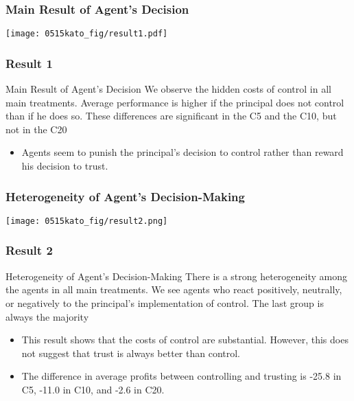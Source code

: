 \documentclass[unicode,12pt]{beamer}
\begin{document}
    \begin{frame}
        \frametitle{Main Result of Agent's Decision}
    
        \centerline{\texttt{[image: 0515kato\_fig/result1.pdf]}}
    
    \end{frame}

    \begin{frame}
        \frametitle{Result 1}
    
        \begin{block}{Main Result of Agent's Decision}
            We observe the hidden costs of control in all main treatments. Average performance is higher if the principal does not control than if he does so. These differences are significant in the C5 and the C10, but not in the C20
        \end{block}
        \begin{itemize}
            \item Agents seem to punish the principal's decision to control rather than reward his decision to trust.
        \end{itemize}
    
    \end{frame}

    \begin{frame}
        \frametitle{Heterogeneity of Agent's Decision-Making}
    
        \centerline{\texttt{[image: 0515kato\_fig/result2.png]}}
    
    \end{frame}

    \begin{frame}
        \frametitle{Result 2}
    
        \begin{block}{Heterogeneity of Agent's Decision-Making}
            There is a strong heterogeneity among the agents in all main treatments. We see agents who react positively, neutrally, or negatively to the principal's implementation of control. The last group is always the majority
        \end{block}
        \begin{itemize}
            \item This result shows that the costs of control are substantial. However, this does not suggest that trust is always better than control.
            \item The difference in average profits between controlling and trusting is -25.8 in C5, -11.0 in C10, and -2.6 in C20.
        \end{itemize}
    
    \end{frame}
\end{document}
